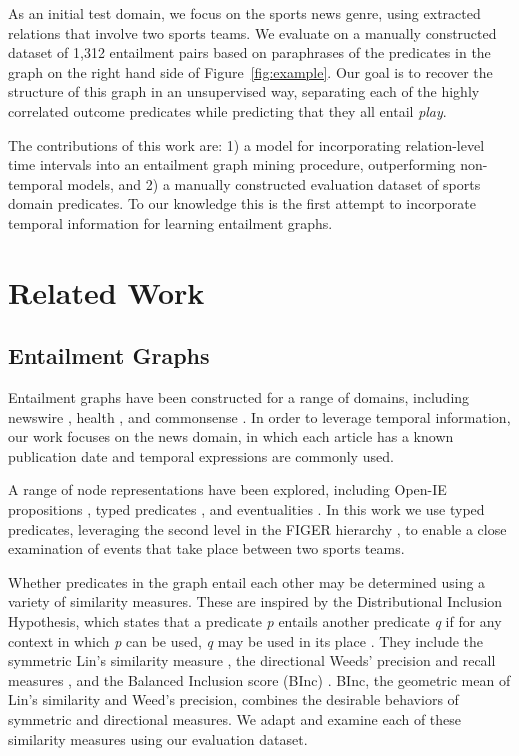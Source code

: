 \documentclass[11pt]{article}
\begin{document}
As an initial test domain, we focus on the sports news genre, using extracted relations that involve two sports teams. We evaluate on a manually constructed dataset of 1,312 entailment pairs based on paraphrases of the predicates in the graph on the right hand side of Figure~\ref{fig:example}. Our goal is to recover the structure of this graph in an unsupervised way, separating each of the highly correlated outcome predicates while predicting that they all entail \textit{play}.
 
The contributions of this work are: 1) a model for incorporating relation-level time intervals into an entailment graph mining procedure, outperforming non-temporal models, and 2) a manually constructed evaluation dataset of sports domain predicates. To our knowledge this is the first attempt to incorporate temporal information for learning entailment graphs.


\section{Related Work}
\label{sec:related_work}

\subsection{Entailment Graphs}
\label{subsec:entailment_graphs}

Entailment graphs have been constructed for a range of domains, including newswire \cite{hosseini2018}, health \cite{levy2014}, and commonsense \cite{yu2020}. In order to leverage temporal information, our work focuses on the news domain, in which each article has a known publication date and temporal expressions are commonly used.

A range of node representations have been explored, including Open-IE propositions \cite{levy2014}, typed predicates \cite{berant2011,hosseini2018}, and eventualities \cite{yu2020}. In this work we use typed predicates, leveraging the second level in the FIGER hierarchy \cite{ling2012}, to enable a close examination of events that take place between two sports teams.


Whether predicates in the graph entail each other may be determined using a variety of similarity measures. These are inspired by the Distributional Inclusion Hypothesis, which states that a predicate \textit{p} entails another predicate \textit{q} if for any context in which \textit{p} can be used, \textit{q} may be used in its place \cite{dagan1999,geffet2005}. They include the symmetric Lin's similarity measure \cite{lin1998}, the directional Weeds' precision and recall measures \cite{weeds2003}, and the Balanced Inclusion score (BInc) \cite{szpektor2008}. BInc, the geometric mean of Lin’s similarity and Weed’s precision, combines the desirable behaviors of symmetric and directional measures. We adapt and examine each of these similarity measures using our evaluation dataset.
\end{document}
